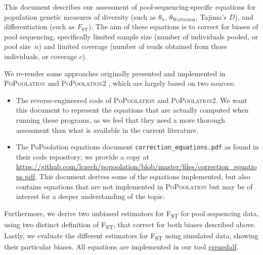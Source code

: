 \documentclass[a4paper,fontsize=9pt,DIV=14]{scrartcl}
\newcommand\toolname{\textsc}
\newcommand{\samplesize}{n}
\newcommand{\coverage}{c}
\newcommand{\fst}{F\textsubscript{ST}}
\newcommand{\mathfst}{F_\text{ST}}
\begin{document}
This document describes our assessment of pool-sequencing-specific equations for population genetic measures of diversity (such as $\theta_\pi$, $\theta_\text{Watterson}$, Tajima's $D$), and differentiation (such as $\mathfst$).
The aim of these equations is to correct for biases of pool sequencing, specifically limited sample size (number of individuals pooled, or pool size~$\samplesize$) and limited coverage (number of reads obtained from those individuals, or coverage $\coverage$).

We re-render some approaches originally presented and implemented in \toolname{PoPoolation} \cite{Kofler2011a} and \toolname{PoPoolation2} \cite{Kofler2011b}, which are largely based on two sources:
\begin{itemize}
  \item The reverse-engineered code of \toolname{PoPoolation} and \toolname{PoPoolation2}. We want this document to represent the equations that are actually computed when running these programs, as we feel that they need a more thorough assessment than what is available in the current literature.
  \item The PoPoolation equations document \texttt{correction\_equations.pdf} as found in their code repository; we provide a copy at \url{https://github.com/lczech/popoolation/blob/master/files/correction_equations.pdf}. This document derives some of the equations implemented, but also contains equations that are not implemented in \toolname{PoPoolation} but may be of interest for a deeper understanding of the topic.
\end{itemize}

Furthermore, we derive two unbiased estimators for \fst{} for pool sequencing data, using two distinct definition of \fst{}, that correct for both biases described above.
Lastly, we evaluate the different estimators for \fst{} using simulated data, showing their particular biases.
All equations are implemented in our tool \href{https://github.com/lczech/grenedalf}{grenedalf}.


\tableofcontents

\end{document}
